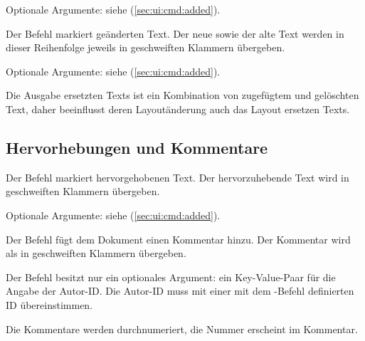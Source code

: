Optionale Argumente: siehe  (\autoref{sec:ui:cmd:added}).





Der Befehl  markiert geänderten Text.
Der neue sowie der alte Text werden in dieser Reihenfolge jeweils in geschweiften Klammern übergeben.

Optionale Argumente: siehe  (\autoref{sec:ui:cmd:added}).

Die Ausgabe ersetzten Texts ist ein Kombination von zugefügtem und gelöschten Text, daher beeinflusst deren Layoutänderung auch das Layout ersetzen Texts.




\subsection{Hervorhebungen und Kommentare}
\label{sec:ui:comment}

\localtableofcontents



Der Befehl  markiert hervorgehobenen Text.
Der hervorzuhebende Text wird in geschweiften Klammern übergeben.

Optionale Argumente: siehe  (\autoref{sec:ui:cmd:added}).





Der Befehl  fügt dem Dokument einen Kommentar hinzu.
Der Kommentar wird als in geschweiften Klammern übergeben.

Der Befehl besitzt nur ein optionales Argument: ein Key-Value-Paar für die Angabe der Autor-ID.
Die Autor-ID muss mit einer mit dem -Befehl definierten ID übereinstimmen.

Die Kommentare werden durchnumeriert, die Nummer erscheint im Kommentar.








